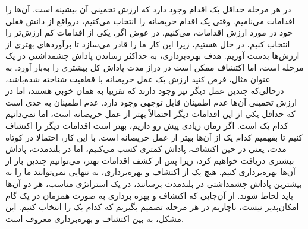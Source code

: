 در هر مرحله حداقل یک اقدام وجود دارد
که ارزش تخمینی آن بیشینه است. آن‌ها را اقدامات  می‌نامیم. وقتی یک اقدام حریصانه را انتخاب می‌کنیم،
درواقع از دانش فعلی خود در مورد ارزش اقدامات،  می‌کنیم. در عوض اگر،
یکی از اقدامات کم ارزش‌تر را انتخاب کنیم، در حال  هستیم، زیرا این کار ما را قادر می‌سازد تا برآوردهای بهتری از ارزش‌ها بدست آوریم. هدف بهره‌برداری، به حداکثر رساندن پاداش چشمداشتی در یک مرحله است، اما اکتشاف ممکن است در دراز مدت پاداش کل بیشتری را به‌بار‌ آورد.
به عنوان مثال، فرض کنید ارزش یک عمل حریصانه با قطعیت شناخته شده‌باشد، در‌حالی‌‌که چندین عمل دیگر نیز وجود دارند که
تقریبا به همان خوبی  هستند، اما در ارزش تخمینی آن‌ها عدم اطمینان قابل توجهی  وجود دارد. عدم اطمینان به حدی است که حداقل
یکی از این اقدامات دیگر احتمالاً بهتر از عمل حریصانه است، اما نمی‌دانیم کدام یک است.
اگر زمان زیادی پیش رو داریم، بهتر است
اقدامات دیگر را اکتشاف کنیم تا بفهمیم کدام یک از آن‌ها بهتر از عمل حریصانه است. با این کار، احتمالا در کوتاه مدت، یعنی در حین اکتشاف، پاداش کمتری کسب می‌کنیم، اما در بلندمدت، پاداش بیشتری دریافت خواهیم کرد، زیرا پس از کشف اقدامات بهتر، می‌توانیم چندین بار از آن‌ها بهره‌برداری کنیم. 
هیچ یک از اکتشاف و بهره‌برداری، به تنهایی نمی‌توانند ما را به بیشترین پاداش چشمداشتی در بلندمدت برسانند، در یک استراتژی مناسب، هر دو آن‌ها باید لحاظ شوند. از آن‌جایی که اکتشاف و بهره برداری به صورت همزمان در یک گام امکان‌پذیر نیست، ناچاریم در هر مرحله تصمیم بگیریم که کدام یک را انتخاب کنیم. این مشکل، به  بین اکتشاف و بهره‌برداری معروف است.



